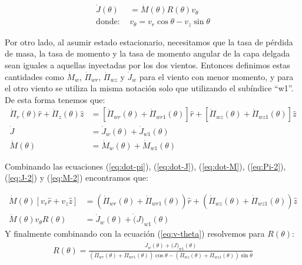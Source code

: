 \begin{align}
  \dot{J}(\theta) &= \dot{M}(\theta)R(\theta)v_\theta \label{eq:dot-J}\\
  \mathrm{donde:~} & v_\theta = v_r\cos\theta - v_z\sin\theta \label{eq:v-theta}
\end{align}

Por otro lado, al asumir estado estacionario, necesitamos que la tasa de pérdida de masa, la tasa de
momento y la tasa de momento angular de la capa delgada sean iguales a aquellas inyectadas por los dos
vientos. Entonces definimos estas cantidades como $\dot{M}_w$, $\dot{\Pi}_{wr}$, $\dot{\Pi}_{wz}$ y
$\dot{J}_{w}$ para el viento con menor momento, y para el otro viento se utiliza la misma notación
solo que utilizando el subíndice ``w1''. De esta forma tenemos que:
\begin{align}
  \dot{\Pi}_r(\theta)\hat{r} + \dot{\Pi}_z(\theta)\hat{z} &= \left[\dot{\Pi}_{wr}(\theta)+ \dot{\Pi}_{wr1}(\theta)
                                                            \right]\hat{r} + \left[\dot{\Pi}_{wz}(\theta)+ \dot{\Pi}_{wz1}(\theta)\right]\hat{z}
                                                            \label{eq:Pi-2} \\
  \dot{J} &=\dot{J}_w(\theta) + \dot{J}_{w1}(\theta) \label{eq:J-2}\\
  \dot{M}(\theta) &= \dot{M}_w(\theta) + \dot{M}_{w1}(\theta) \label{eq:M-2}
\end{align}

Combinando las ecuaciones (\ref{eq:dot-pi}), (\ref{eq:dot-J}), (\ref{eq:dot-M}), (\ref{eq:Pi-2}), (\ref{eq:J-2}) y (\ref{eq:M-2})
encontramos que:

\begin{align}
  \dot{M}(\theta)\left[v_r \hat{r} + v_z\hat{z}\right] &= \left(\dot{\Pi}_{wr}(\theta) + \dot{\Pi}_{wr1}(\theta)\right)\hat{r} +
                                                         \left(\dot{\Pi}_{wz}(\theta) + \dot{\Pi}_{wz1}(\theta)\right)\hat{z} \\
  \dot{M}(\theta)v_\theta R(\theta) &= \dot{J}_w(\theta) + \dot(J)_{w1}(\theta)
\end{align}
Y finalmente combinando con la ecuación (\ref{eq:v-theta}) resolvemos para $R(\theta)$:
\begin{align}
  R(\theta) = \frac{\dot{J}_w(\theta) + \dot(J)_{w1}(\theta)}{\left(\dot{\Pi}_{wr}(\theta) + \dot{\Pi}_{wr1}(\theta)\right)\cos\theta
  - \left(\dot{\Pi}_{wz}(\theta) + \dot{\Pi}_{wz1}(\theta)\right)\sin\theta} \label{eq:R-wind}
\end{align}



